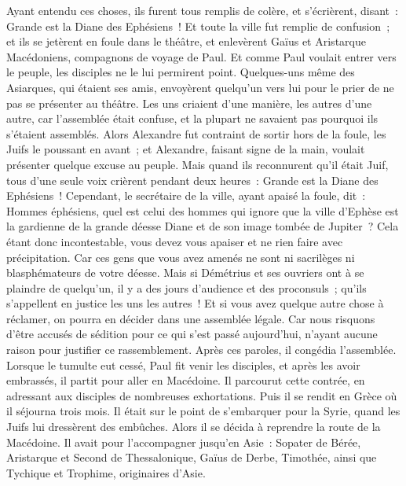 \begin{multicols}{2}
Ayant entendu ces choses, ils furent tous remplis de colère, et s'écrièrent, disant~: Grande est la Diane des Ephésiens~!
Et toute la ville fut remplie de confusion~; et ils se jetèrent en foule dans le théâtre, et enlevèrent Gaïus et Aristarque Macédoniens, compagnons de voyage de Paul.
Et comme Paul voulait entrer vers le peuple, les disciples ne le lui permirent point.
Quelques-uns même des Asiarques, qui étaient ses amis, envoyèrent quelqu'un vers lui pour le prier de ne pas se présenter au théâtre.
Les uns criaient d'une manière, les autres d'une autre, car l'assemblée était confuse, et la plupart ne savaient pas pourquoi ils s'étaient assemblés.
Alors Alexandre fut contraint de sortir hors de la foule, les Juifs le poussant en avant~; et Alexandre, faisant signe de la main, voulait présenter quelque excuse au peuple.
Mais quand ils reconnurent qu'il était Juif, tous d'une seule voix crièrent pendant deux heures~: Grande est la Diane des Ephésiens~!
Cependant, le secrétaire de la ville, ayant apaisé la foule, dit~: Hommes éphésiens, quel est celui des hommes qui ignore que la ville d'Ephèse est la gardienne de la grande déesse Diane et de son image tombée de Jupiter~?
Cela étant donc incontestable, vous devez vous apaiser et ne rien faire avec précipitation.
Car ces gens que vous avez amenés ne sont ni sacrilèges ni blasphémateurs de votre déesse.
Mais si Démétrius et ses ouvriers ont à se plaindre de quelqu'un, il y a des jours d'audience et des proconsuls~; qu'ils s'appellent en justice les uns les autres~!
Et si vous avez quelque autre chose à réclamer, on pourra en décider dans une assemblée légale.
Car nous risquons d'être accusés de sédition pour ce qui s'est passé aujourd'hui, n'ayant aucune raison pour justifier ce rassemblement. Après ces paroles, il congédia l'assemblée.
\VerseOne{}Lorsque le tumulte eut cessé, Paul fit venir les disciples, et après les avoir embrassés, il partit pour aller en Macédoine.
Il parcourut cette contrée, en adressant aux disciples de nombreuses exhortations.
Puis il se rendit en Grèce où il séjourna trois mois. Il était sur le point de s'embarquer pour la Syrie, quand les Juifs lui dressèrent des embûches. Alors il se décida à reprendre la route de la Macédoine.
Il avait pour l'accompagner jusqu'en Asie~: Sopater de Bérée, Aristarque et Second de Thessalonique, Gaïus de Derbe, Timothée, ainsi que Tychique et Trophime, originaires d'Asie.

\end{multicols}
